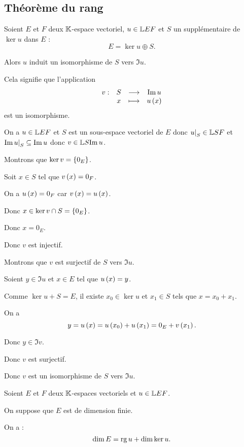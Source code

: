 \subsection{Théorème du rang}

\begin{theo}
Soient \(E\) et \(F\) deux \(\mathbb{K}\)-espace vectoriel, \(u\in\mathbb{L}{E}{F}\) et \(S\) un supplémentaire de \(\ker u\) dans \(E\) : \[E=\ker u\oplus S.\]

Alors \(u\) induit un isomorphisme de \(S\) vers \(\Im u\).

Cela signifie que l'application \[\begin{array}[t]{cccc}v : & S & \longrightarrow & \operatorname{Im} u \\ & x & \longmapsto & u\left(x\right)\end{array}\] est un isomorphisme.
\end{theo}

\begin{dem}
On a \(u\in\mathbb{L}{E}{F}\) et \(S\) est un sous-espace vectoriel de \(E\) donc \(\restr{u}{S}\in\L{S}{F}\) et \(\Im\restr{u}{S}\subset\Im u\) donc \(v\in\mathbb{L}{S}{\operatorname{Im} u}\).

Montrons que \(\ker v=\left\lbrace0_E\right\rbrace\).

Soit \(x\in S\) tel que \(v\left(x\right)=0_F\).

On a \(u\left(x\right)=0_F\) car \(v\left(x\right)=u\left(x\right)\).

Donc \(x\in\ker v\cap S=\left\lbrace0_E\right\rbrace\).

Donc \(x=0_E\).

Donc \(v\) est injectif.

Montrons que \(v\) est surjectif de \(S\) vers \(\Im u\).

Soient \(y\in\Im u\) et \(x\in E\) tel que \(u\left(x\right)=y\).

Comme \(\ker u+S=E\), il existe \(x_0\in\ker u\) et \(x_1\in S\) tels que \(x=x_0+x_1\).

On a \[y=u\left(x\right)=u\left(x_0\right)+u\left(x_1\right)=0_E+v\left(x_1\right).\]

Donc \(y\in\Im v\).

Donc \(v\) est surjectif.

Donc \(v\) est un isomorphisme de \(S\) vers \(\Im u\).
\end{dem}

\begin{theo}
Soient \(E\) et \(F\) deux \(\mathbb{K}\)-espaces vectoriels et \(u\in\mathbb{L}{E}{F}\).

On suppose que \(E\) est de dimension finie.

On a : \[\dim E=\operatorname{rg} u+\dim\ker u.\]
\end{theo}

